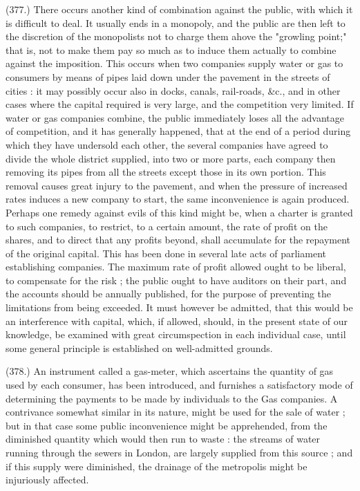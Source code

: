 \documentclass{article}
\begin{document}
(377.) There occurs another kind of combination against the public, with which it is difficult to deal. It usually ends in a monopoly, and the public are then left to the discretion of the monopolists not to charge them ahove the "growling point;" that is, not to make them pay so much as to induce them actually to combine against the imposition. This occurs when two companies supply water or gas to consumers by means of pipes laid down under the pavement in the streets of cities : it may possibly occur also in docks, canals, rail-roads, \&c., and in other cases where the capital required is very large, and the competition very limited. If water or gas companies combine, the public immediately loses all the advantage of competition, and it has generally happened, that at the end of a period during which they have undersold each other, the several companies have agreed to divide the whole district supplied, into two or more parts, each company then removing its pipes from all the streets except those in its own portion. This removal causes great injury to the pavement, and when the pressure of increased rates induces a new company to start, the same inconvenience is again produced. Perhaps one remedy against evils of this kind might be, when a charter is granted to such companies, to restrict, to a certain amount, the rate of profit on the shares, and to direct that any profits beyond, shall accumulate for the repayment of the original capital. This has been done in several late acts of parliament establishing companies. The maximum rate of profit allowed ought to be liberal, to compensate for the risk ; the public ought to have auditors on their part, and the accounts should be annually published, for the purpose of preventing the limitations from being exceeded. It must however be admitted, that this would be an interference with capital, which, if allowed, should, in the present state of our knowledge, be examined with great circumspection in each individual case, until some general principle is established on well-admitted grounds.


(378.) An instrument called a gas-meter, which ascertains the quantity of gas used by each consumer, has been introduced, and furnishes a satisfactory mode of determining the payments to be made by individuals to the Gas companies. A contrivance somewhat similar in its nature, might be used for the sale of water ; but in that case some public inconvenience might be apprehended, from the diminished quantity which would then run to waste : the streams of water running through the sewers in London, are largely supplied from this source ; and if this supply were diminished, the drainage of the metropolis might be injuriously affected.
\end{document}
